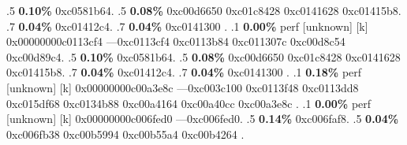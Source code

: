 \begin{profile}
{.5 \textbf{0.10\%} 0xc0581b64. 
.5 \textbf{0.08\%} 0xc00d6650\newline {} 0xc01c8428\newline {} 0xc0141628\newline {} 0xc01415b8. 
.7 \textbf{0.04\%} 0xc01412c4. 
.7 \textbf{0.04\%} 0xc0141300\newline {} . 
.1 \textbf{ 0.00\%} perf             [unknown]              [k] 0x00000000c0113cf4\newline {} ---0xc0113cf4\newline {} 0xc0113b84\newline {} 0xc011307c\newline {} 0xc00d8c54\newline {} 0xc00d89c4. 
.5 \textbf{0.10\%} 0xc0581b64. 
.5 \textbf{0.08\%} 0xc00d6650\newline {} 0xc01c8428\newline {} 0xc0141628\newline {} 0xc01415b8. 
.7 \textbf{0.04\%} 0xc01412c4. 
.7 \textbf{0.04\%} 0xc0141300\newline {} . 
.1 \textbf{ 0.18\%} perf             [unknown]              [k] 0x00000000c00a3e8c\newline {} ---0xc003c100\newline {} 0xc0113f48\newline {} 0xc0113dd8\newline {} 0xc015df68\newline {} 0xc0134b88\newline {} 0xc00a4164\newline {} 0xc00a40cc\newline {} 0xc00a3e8c\newline {} . 
.1 \textbf{ 0.00\%} perf             [unknown]              [k] 0x00000000c006fed0\newline {} ---0xc006fed0. 
.5 \textbf{0.14\%} 0xc006faf8. 
.5 \textbf{0.04\%} 0xc006fb38\newline {} 0xc00b5994\newline {} 0xc00b55a4\newline {} 0xc00b4264\newline {} . 
}
\end{profile}
